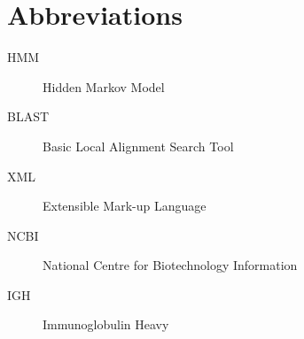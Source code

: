\chapter*{Abbreviations}\label{abbr}
\begin{description}
	\item[HMM] Hidden Markov Model
	\item[BLAST] Basic Local Alignment Search Tool
	\item[XML] Extensible Mark-up Language
	\item[NCBI] National Centre for Biotechnology Information
    \item[IGH] Immunoglobulin Heavy
\end{description}
